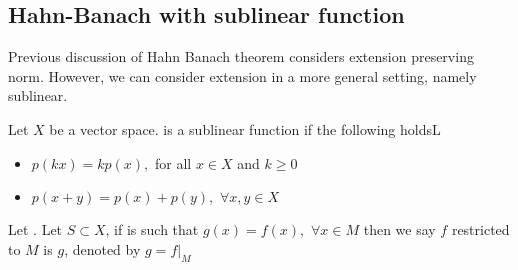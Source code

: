 \subsection{Hahn-Banach with sublinear function}
Previous discussion of Hahn Banach theorem considers extension preserving norm. However, we can consider extension in a more general setting, namely sublinear.
\begin{definition}\rm\nextline
	Let $X$ be a vector space.  is a sublinear function if the following holdsL
	\begin{itemize}
		\item $p(kx)=kp(x),$ for all $x\in X$ and $k\geq0$
		\item $p(x+y)=p(x)+p(y),\,\,\forall x,y\in X$
	\end{itemize}
\end{definition}

\begin{definition}[Restriction]\rm\nextline
	Let . Let $S\subset X$, if  is such that $g(x)=f(x),\,\,\forall x\in M$ then we say $f$ restricted to $M$ is $g$, denoted by $g=f|_M$	
\end{definition}
\begin{theorem}\rm\nextline 
	
\end{theorem}